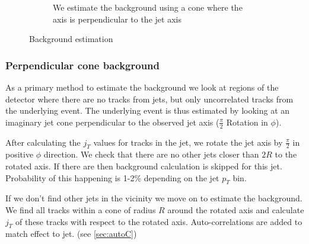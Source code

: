 \begin{figure}
\begin{subfigure}{0.4\textwidth}
\caption{We estimate the background using a cone where the axis is perpendicular to the jet axis}
\end{subfigure}
\caption{Background estimation}
\label{fig:bgdef}
\end{figure}

\subsubsection{Perpendicular cone background}
As a primary method to estimate the background we look at regions of the detector where there are no tracks from jets, but only uncorrelated tracks from the underlying event. The underlying event is thus estimated by looking at an imaginary jet cone perpendicular to the observed jet axis ($\frac{\pi}{2}$ Rotation in $\phi$). 


After calculating the $j_T$ values for tracks in the jet, we rotate the jet axis by $\frac{\pi}{2}$ in positive $\phi$ direction. We check that there are no other jets closer than $2R$ to the rotated axis. If there are then background calculation is skipped for this jet. Probability of this happening is 1-2\% depending on the jet $p_T$ bin.

If we don't find other jets in the vicinity we move on to estimate the background. We find all tracks within a cone of radius $R$ around the rotated axis and calculate $j_T$ of these tracks with respect to the rotated axis. Auto-correlations are added to match effect to jet. (see \ref{sec:autoC})


